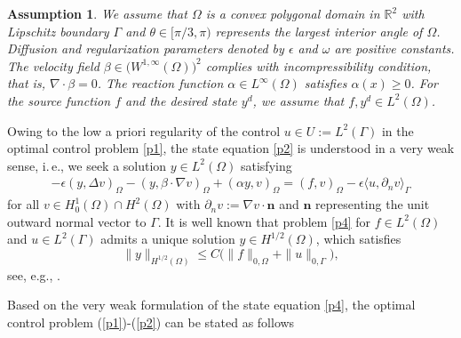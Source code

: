 \documentclass[a4paper,10pt]{article}
\newcommand{\bn}{{\mathbf{n}}}
\newtheorem{assumption}[theorem]{Assumption}
\numberwithin{theorem}{section}
\begin{document}
\begin{assumption}\label{assumption_data}
We assume that $\Omega$ is a convex polygonal domain in $\mathbb{R}^2$ with Lipschitz boundary $\Gamma$ and $\theta \in [\pi/3, \pi)$ represents the largest interior angle of $\Omega$. Diffusion and regularization parameters denoted by $\epsilon$ and $\omega$ are positive constants. The velocity field $\beta \in \big(W^{1,\infty}(\Omega)\big)^2$ complies with incompressibility condition, that is, $\nabla \cdot \beta=0$. The reaction function $\alpha \in L^{\infty}(\Omega)$ satisfies $\alpha(x) \geq 0$. For the source function $f$ and the desired state $y^d$, we assume that $f, y^d \in L^2(\Omega)$.
\end{assumption}

Owing to the low a priori regularity of the control $u\in U:= L^2(\Gamma)$ in the optimal control problem \eqref{p1}, the state equation \eqref{p2} is understood in a very weak sense, i.\,e., we seek a solution $y \in L^2(\Omega)$ satisfying
\begin{align}\label{p4}
-\epsilon (y, \Delta v )_\Omega - (y, \beta \cdot \nabla v )_\Omega + (\alpha y, v)_\Omega = (f,v)_\Omega - \epsilon \langle u, \partial_n v \rangle_{\Gamma}
\end{align}
for all $v \in H_0^1 (\Omega) \cap H^2(\Omega)$ with $\partial_n v := \nabla v \cdot \bn$ and $\bn$ representing the unit outward normal vector to $\Gamma$. It is well known that problem \eqref{p4} for $f\in L^2(\Omega)$ and $u \in L^2(\Gamma)$ admits a unique solution $y\in H^{1/2}(\Omega)$, which  satisfies
  \begin{equation}\label{p5}
    \|y\|_{H^{1/2}(\Omega)} \leq C \big( \|f\|_{0,\Omega} + \|u\|_{0,\Gamma} \big),
\end{equation}
see, e.g., \cite{ECasas_MMateos_JPRaymond_2009, KKunisch_BVexler_2007c,JPfefferer_BVexler_2025}.


Based on the very weak formulation of the state equation \eqref{p4}, the optimal control problem (\ref{p1})-(\ref{p2}) can be stated as follows
\end{document}
